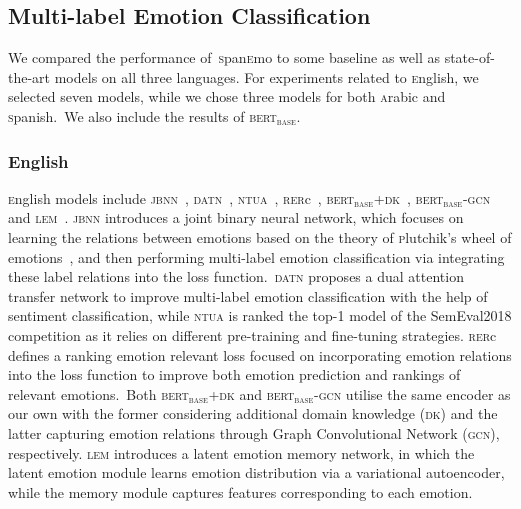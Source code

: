 \documentclass[11pt,a4paper]{article}
\begin{document}
\subsection{Multi-label Emotion Classification}\label{bl}
We compared the performance of~\textsc{s}pan\textsc{e}mo to some baseline as well as state-of-the-art models on all three languages. For experiments related to \textsc{e}nglish, we selected seven models, while we chose three models for both \textsc{a}rabic and \textsc{s}panish.~We also include the results of \textsc{bert$_{\text{base}}$}.

\subsubsection{English}
\textsc{e}nglish models include
\textsc{jbnn}~\cite{he2018joint}, \textsc{datn}~\cite{yu2018improving}, \textsc{ntua}~\cite{baziotis2018ntua}, \textsc{rer}c~\cite{zhou2018relevant}, \textsc{bert$_{\text{base}}$}+\textsc{dk}~\cite{ying-etal-2019-improving}, \textsc{bert$_{\text{base}}$-gcn}~\cite{xu2020emograph} and \textsc{lem}~\cite{fei2020latent}. \textsc{jbnn} introduces a joint binary neural network, which focuses on learning the relations between emotions based on the theory of \textsc{p}lutchik’s wheel of emotions~\cite{plutchik1980emotion}, and then performing multi-label emotion classification via integrating these label relations into the loss function.~\textsc{datn} proposes a dual attention transfer network to improve multi-label emotion classification with the help of sentiment classification, while \textsc{ntua} is ranked the top-1 model of the SemEval2018 competition as it relies on different pre-training and fine-tuning strategies. \textsc{rer}c defines a ranking emotion relevant loss focused on incorporating emotion relations into the loss function to improve both emotion prediction and rankings of relevant emotions.~Both \textsc{bert$_{\text{base}}$}+\textsc{dk} and \textsc{bert$_{\text{base}}$-gcn} utilise the same encoder as our own with the former considering additional domain knowledge (\textsc{dk}) and the latter capturing emotion relations through Graph Convolutional Network (\textsc{gcn}), respectively. \textsc{lem} introduces a latent emotion memory network, in which the latent emotion module learns emotion distribution via a variational autoencoder, while the memory module captures features corresponding to each emotion.
\end{document}
